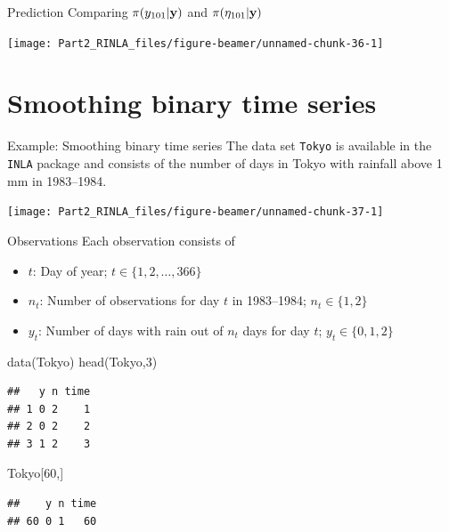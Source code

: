 \documentclass[
  ignorenonframetext,
]{beamer}
\newenvironment{Shaded}{\begin{snugshade}}{\end{snugshade}}
\newcommand{\DecValTok}[1]{\textcolor[rgb]{0.00,0.00,0.81}{#1}}
\newcommand{\FunctionTok}[1]{\textcolor[rgb]{0.00,0.00,0.00}{#1}}
\newcommand{\NormalTok}[1]{#1}
\begin{document}
\begin{frame}{Prediction}
\protect\hypertarget{prediction-5}{}
Comparing \(\pi(y_{101}|\bf{y})\) and \(\pi(\eta_{101}|\bf{y})\)

\begin{center}\texttt{[image: Part2\_RINLA\_files/figure-beamer/unnamed-chunk-36-1]} \end{center}
\normalsize
\end{frame}

\hypertarget{smoothing-binary-time-series}{%
\section{Smoothing binary time
series}\label{smoothing-binary-time-series}}

\begin{frame}[fragile]{Example: Smoothing binary time series}
\protect\hypertarget{example-smoothing-binary-time-series}{}
The data set \texttt{Tokyo} is available in the \texttt{INLA} package
and consists of the number of days in Tokyo with rainfall above 1 mm in
1983--1984.

\begin{center}\texttt{[image: Part2\_RINLA\_files/figure-beamer/unnamed-chunk-37-1]} \end{center}
\end{frame}

\begin{frame}[fragile]{Observations}
\protect\hypertarget{observations}{}
Each observation consists of

\begin{itemize}
\item
  \(t\): Day of year; \(t\in\{1,2,\ldots, 366\}\)
\item
  \(n_t\): Number of observations for day \(t\) in 1983--1984;
  \(n_t\in\{1,2\}\)
\item
  \(y_t\): Number of days with rain out of \(n_t\) days for day \(t\);
  \(y_t \in \{0, 1, 2\}\)
\end{itemize}

\footnotesize

\begin{Shaded}
\begin{Highlighting}[]
 \FunctionTok{data}\NormalTok{(Tokyo)}
\FunctionTok{head}\NormalTok{(Tokyo,}\DecValTok{3}\NormalTok{)}
\end{Highlighting}
\end{Shaded}

\begin{verbatim}
##   y n time
## 1 0 2    1
## 2 0 2    2
## 3 1 2    3
\end{verbatim}

\begin{Shaded}
\begin{Highlighting}[]
\NormalTok{Tokyo[}\DecValTok{60}\NormalTok{,]}
\end{Highlighting}
\end{Shaded}

\begin{verbatim}
##    y n time
## 60 0 1   60
\end{verbatim}

\normalsize
\end{frame}
\end{document}

